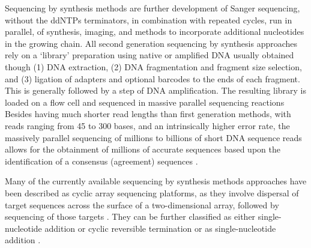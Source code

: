 Sequencing by synthesis methods are further development of Sanger sequencing, without the ddNTPs terminators, in combination with repeated cycles, run in parallel, of synthesis, imaging, and methods to incorporate additional nucleotides in the growing chain. All second generation sequencing by synthesis approaches rely on a ‘library’ preparation using native or amplified DNA usually obtained though (1) DNA extraction, (2) DNA fragmentation and fragment size selection, and (3) ligation of adapters and optional barcodes to the ends of each fragment. This is generally followed by a step of DNA amplification. The resulting library is loaded on a flow cell and sequenced in massive parallel sequencing reactions \citep{giani_long_2020}
Besides having much shorter read lengths than first generation methods, with reads ranging from 45 to 300 bases, and an intrinsically higher error rate, the massively parallel sequencing of millions to billions of short DNA sequence reads allows for the obtainment of millions of accurate sequences based upon the identification of a consensus (agreement) sequences \citep{slatko_overview_2018, goodwin_coming_2016, hagemann_overview_2015}. 

Many of the currently available sequencing by synthesis methods approaches have been described as cyclic array sequencing platforms, as they involve dispersal of target sequences across the surface of a two-dimensional array, followed by sequencing of those targets \citep{hagemann_overview_2015}. They can be further classified as either single-nucleotide addition or cyclic reversible termination or as single-nucleotide addition \citep{goodwin_coming_2016}. 

